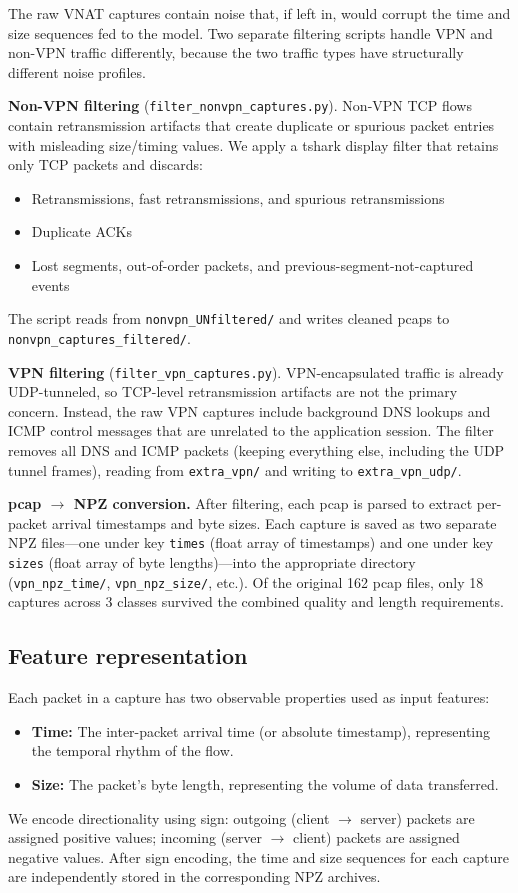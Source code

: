 \documentclass[letterpaper,twocolumn,10pt]{article}
\begin{document}
The raw VNAT captures contain noise that, if left in, would corrupt the time and size sequences fed to the model. Two separate filtering scripts handle VPN and non-VPN traffic differently, because the two traffic types have structurally different noise profiles.

\textbf{Non-VPN filtering} (\texttt{filter\_nonvpn\_captures.py}). Non-VPN TCP flows contain retransmission artifacts that create duplicate or spurious packet entries with misleading size/timing values. We apply a tshark display filter that retains only TCP packets and discards:
\begin{itemize}[leftmargin=1.2em, topsep=0pt]
  \item Retransmissions, fast retransmissions, and spurious retransmissions
  \item Duplicate ACKs
  \item Lost segments, out-of-order packets, and previous-segment-not-captured events
\end{itemize}
The script reads from \texttt{nonvpn\_UNfiltered/} and writes cleaned pcaps to \texttt{nonvpn\_captures\_filtered/}.

\textbf{VPN filtering} (\texttt{filter\_vpn\_captures.py}). VPN-encapsulated traffic is already UDP-tunneled, so TCP-level retransmission artifacts are not the primary concern. Instead, the raw VPN captures include background DNS lookups and ICMP control messages that are unrelated to the application session. The filter removes all DNS and ICMP packets (keeping everything else, including the UDP tunnel frames), reading from \texttt{extra\_vpn/} and writing to \texttt{extra\_vpn\_udp/}.

\textbf{pcap $\to$ NPZ conversion.} After filtering, each pcap is parsed to extract per-packet arrival timestamps and byte sizes. Each capture is saved as two separate NPZ files---one under key \texttt{times} (float array of timestamps) and one under key \texttt{sizes} (float array of byte lengths)---into the appropriate directory (\texttt{vpn\_npz\_time/}, \texttt{vpn\_npz\_size/}, etc.). Of the original 162 pcap files, only 18 captures across 3 classes survived the combined quality and length requirements.

\subsection{Feature representation}
Each packet in a capture has two observable properties used as input features:
\begin{itemize}[leftmargin=1.2em]
  \item \textbf{Time:} The inter-packet arrival time (or absolute timestamp), representing the temporal rhythm of the flow.
  \item \textbf{Size:} The packet's byte length, representing the volume of data transferred.
\end{itemize}
We encode directionality using sign: outgoing (client $\rightarrow$ server) packets are assigned positive values; incoming (server $\rightarrow$ client) packets are assigned negative values. After sign encoding, the time and size sequences for each capture are independently stored in the corresponding NPZ archives.
\end{document}
